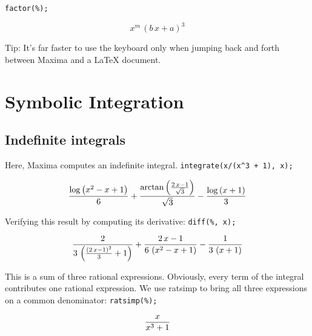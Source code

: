 \documentclass[a4paper,12pt]{article}
\begin{document}
\texttt{factor(\%);}

\begin{equation}
x^{m}\,\left(b\,x+a\right)^3
\end{equation}

Tip: It's far faster to use the keyboard only when jumping back and forth
between Maxima and a \LaTeX{} document.

\section{Symbolic Integration}

\subsection{Indefinite integrals}

Here, Maxima computes an indefinite integral. \texttt{integrate(x/(x\^{}3 + 1),
  x);}

\begin{equation}
{{\log \left(x^2-x+1\right)}\over{6}}+{{\arctan \left({{2\,x-1
 }\over{\sqrt{3}}}\right)}\over{\sqrt{3}}}-{{\log \left(x+1\right)
 }\over{3}}
\end{equation}

Verifying this result by computing its derivative: \texttt{diff(\%, x);}

\begin{equation}
{{2}\over{3\,\left({{\left(2\,x-1\right)^2}\over{3}}+1\right)}}+{{2
 \,x-1}\over{6\,\left(x^2-x+1\right)}}-{{1}\over{3\,\left(x+1\right)
 }}
\end{equation}

This is a sum of three rational expressions.  Obviously, every term of the
integral contributes one rational expression.  We use ratsimp to bring all
three expressions on a common denominator: \texttt{ratsimp(\%);}

\begin{equation}
{{x}\over{x^3+1}}
\end{equation}
\end{document}
